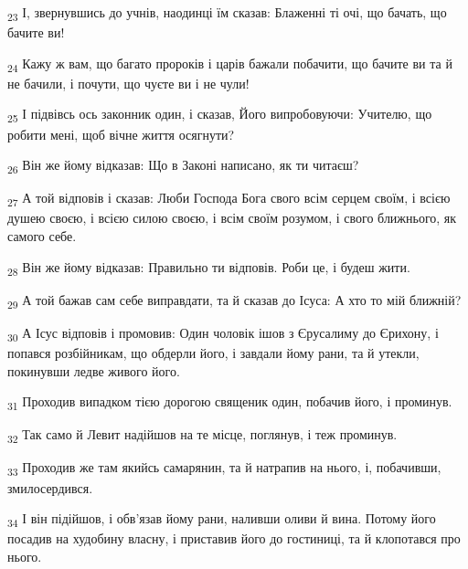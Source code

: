 \begin{tcolorbox}
\textsubscript{23} І, звернувшись до учнів, наодинці їм сказав: Блаженні ті очі, що бачать, що бачите ви!
\end{tcolorbox}
\begin{tcolorbox}
\textsubscript{24} Кажу ж вам, що багато пророків і царів бажали побачити, що бачите ви та й не бачили, і почути, що чуєте ви і не чули!
\end{tcolorbox}
\begin{tcolorbox}
\textsubscript{25} І підвівсь ось законник один, і сказав, Його випробовуючи: Учителю, що робити мені, щоб вічне життя осягнути?
\end{tcolorbox}
\begin{tcolorbox}
\textsubscript{26} Він же йому відказав: Що в Законі написано, як ти читаєш?
\end{tcolorbox}
\begin{tcolorbox}
\textsubscript{27} А той відповів і сказав: Люби Господа Бога свого всім серцем своїм, і всією душею своєю, і всією силою своєю, і всім своїм розумом, і свого ближнього, як самого себе.
\end{tcolorbox}
\begin{tcolorbox}
\textsubscript{28} Він же йому відказав: Правильно ти відповів. Роби це, і будеш жити.
\end{tcolorbox}
\begin{tcolorbox}
\textsubscript{29} А той бажав сам себе виправдати, та й сказав до Ісуса: А хто то мій ближній?
\end{tcolorbox}
\begin{tcolorbox}
\textsubscript{30} А Ісус відповів і промовив: Один чоловік ішов з Єрусалиму до Єрихону, і попався розбійникам, що обдерли його, і завдали йому рани, та й утекли, покинувши ледве живого його.
\end{tcolorbox}
\begin{tcolorbox}
\textsubscript{31} Проходив випадком тією дорогою священик один, побачив його, і проминув.
\end{tcolorbox}
\begin{tcolorbox}
\textsubscript{32} Так само й Левит надійшов на те місце, поглянув, і теж проминув.
\end{tcolorbox}
\begin{tcolorbox}
\textsubscript{33} Проходив же там якийсь самарянин, та й натрапив на нього, і, побачивши, змилосердився.
\end{tcolorbox}
\begin{tcolorbox}
\textsubscript{34} І він підійшов, і обв'язав йому рани, наливши оливи й вина. Потому його посадив на худобину власну, і приставив його до гостиниці, та й клопотався про нього.
\end{tcolorbox}
